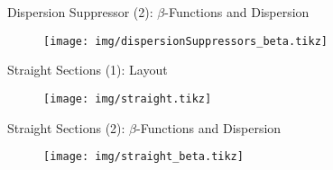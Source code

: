 \documentclass{beamer}
\begin{document}
\begin{frame}[t,fragile]{Dispersion Suppressor (2): $\beta$-Functions and Dispersion}
\begin{figure}
\centering
\texttt{[image: img/dispersionSuppressors\_beta.tikz]}
\end{figure}
\end{frame}

\begin{frame}[t]{Straight Sections (1): Layout}
\begin{figure}
\centering
\texttt{[image: img/straight.tikz]}
\end{figure}
\end{frame}

\begin{frame}[t,fragile]{Straight Sections (2): $\beta$-Functions and Dispersion}
\begin{figure}
\centering
\texttt{[image: img/straight\_beta.tikz]}
\end{figure}
\end{frame}
\end{document}
